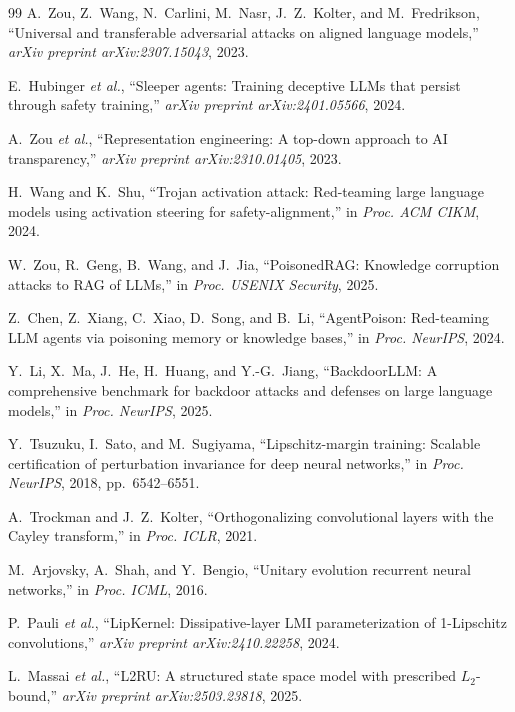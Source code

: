 \documentclass[12pt,a4paper]{article}
\theoremstyle{definition}
\theoremstyle{remark}
\begin{document}
\begin{thebibliography}{99}
A.~Zou, Z.~Wang, N.~Carlini, M.~Nasr, J.~Z.~Kolter, and M.~Fredrikson, ``Universal and transferable adversarial attacks on aligned language models,'' \emph{arXiv preprint arXiv:2307.15043}, 2023.

E.~Hubinger \emph{et al.}, ``Sleeper agents: Training deceptive {LLMs} that persist through safety training,'' \emph{arXiv preprint arXiv:2401.05566}, 2024.

A.~Zou \emph{et al.}, ``Representation engineering: A top-down approach to AI transparency,'' \emph{arXiv preprint arXiv:2310.01405}, 2023.

H.~Wang and K.~Shu, ``Trojan activation attack: Red-teaming large language models using activation steering for safety-alignment,'' in \emph{Proc. ACM CIKM}, 2024.

W.~Zou, R.~Geng, B.~Wang, and J.~Jia, ``{PoisonedRAG}: Knowledge corruption attacks to RAG of {LLMs},'' in \emph{Proc. USENIX Security}, 2025.

Z.~Chen, Z.~Xiang, C.~Xiao, D.~Song, and B.~Li, ``{AgentPoison}: Red-teaming {LLM} agents via poisoning memory or knowledge bases,'' in \emph{Proc. NeurIPS}, 2024.


Y.~Li, X.~Ma, J.~He, H.~Huang, and Y.-G.~Jiang, ``{BackdoorLLM}: A comprehensive benchmark for backdoor attacks and defenses on large language models,'' in \emph{Proc. NeurIPS}, 2025.

Y.~Tsuzuku, I.~Sato, and M.~Sugiyama, ``Lipschitz-margin training: Scalable certification of perturbation invariance for deep neural networks,'' in \emph{Proc. NeurIPS}, 2018, pp.~6542--6551.

A.~Trockman and J.~Z.~Kolter, ``Orthogonalizing convolutional layers with the {Cayley} transform,'' in \emph{Proc. ICLR}, 2021.

M.~Arjovsky, A.~Shah, and Y.~Bengio, ``Unitary evolution recurrent neural networks,'' in \emph{Proc. ICML}, 2016.

P.~Pauli \emph{et al.}, ``{LipKernel}: Dissipative-layer LMI parameterization of 1-{Lipschitz} convolutions,'' \emph{arXiv preprint arXiv:2410.22258}, 2024.

L.~Massai \emph{et al.}, ``{L2RU}: A structured state space model with prescribed $L_2$-bound,'' \emph{arXiv preprint arXiv:2503.23818}, 2025.


\end{thebibliography}
\end{document}
